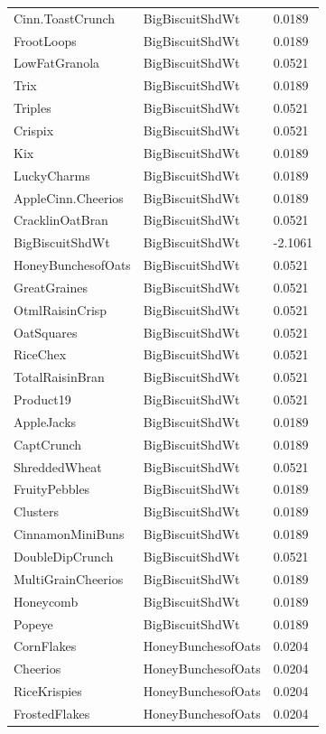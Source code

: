 \begin{table}[!htbp]
\begin{tabular}{lll}
Cinn.ToastCrunch & BigBiscuitShdWt & 0.0189
\\
FrootLoops & BigBiscuitShdWt & 0.0189
\\
LowFatGranola & BigBiscuitShdWt & 0.0521
\\
Trix & BigBiscuitShdWt & 0.0189
\\
Triples & BigBiscuitShdWt & 0.0521
\\
Crispix & BigBiscuitShdWt & 0.0521
\\
Kix & BigBiscuitShdWt & 0.0189
\\
LuckyCharms & BigBiscuitShdWt & 0.0189
\\
AppleCinn.Cheerios & BigBiscuitShdWt & 0.0189
\\
CracklinOatBran & BigBiscuitShdWt & 0.0521
\\
BigBiscuitShdWt & BigBiscuitShdWt & -2.1061
\\
HoneyBunchesofOats & BigBiscuitShdWt & 0.0521
\\
GreatGraines & BigBiscuitShdWt & 0.0521
\\
OtmlRaisinCrisp & BigBiscuitShdWt & 0.0521
\\
OatSquares & BigBiscuitShdWt & 0.0521
\\
RiceChex & BigBiscuitShdWt & 0.0521
\\
TotalRaisinBran & BigBiscuitShdWt & 0.0521
\\
Product19 & BigBiscuitShdWt & 0.0521
\\
AppleJacks & BigBiscuitShdWt & 0.0189
\\
CaptCrunch & BigBiscuitShdWt & 0.0189
\\
ShreddedWheat & BigBiscuitShdWt & 0.0521
\\
FruityPebbles & BigBiscuitShdWt & 0.0189
\\
Clusters & BigBiscuitShdWt & 0.0189
\\
CinnamonMiniBuns & BigBiscuitShdWt & 0.0189
\\
DoubleDipCrunch & BigBiscuitShdWt & 0.0521
\\
MultiGrainCheerios & BigBiscuitShdWt & 0.0189
\\
Honeycomb & BigBiscuitShdWt & 0.0189
\\
Popeye & BigBiscuitShdWt & 0.0189
\\
CornFlakes & HoneyBunchesofOats & 0.0204
\\
Cheerios & HoneyBunchesofOats & 0.0204
\\
RiceKrispies & HoneyBunchesofOats & 0.0204
\\
FrostedFlakes & HoneyBunchesofOats & 0.0204

\end{tabular}
\end{table}
